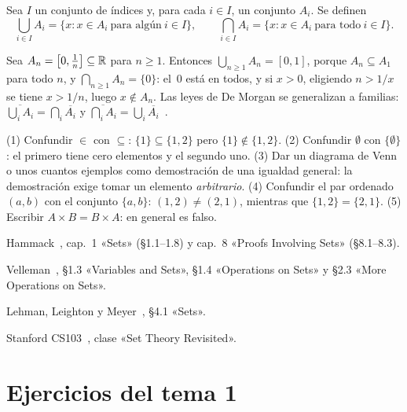 \begin{definicion}
Sea $I$ un conjunto de índices y, para cada $i\in I$, un conjunto $A_i$. Se definen
\[
\bigcup_{i\in I}A_i=\{x : x\in A_i\ \text{para algún}\ i\in I\},\qquad
\bigcap_{i\in I}A_i=\{x : x\in A_i\ \text{para todo}\ i\in I\}.
\]
\end{definicion}

\begin{ejemplo}
Sea $A_n=\bigl[0,\tfrac1n\bigr]\subseteq\mathbb{R}$ para $n\ge 1$. Entonces $\bigcup_{n\ge1}A_n=[0,1]$, porque $A_n\subseteq A_1$ para todo $n$, y $\bigcap_{n\ge 1}A_n=\{0\}$: el~0 está en todos, y si $x>0$, eligiendo $n>1/x$ se tiene $x>1/n$, luego $x\notin A_n$. Las leyes de De Morgan se generalizan a familias: $\overline{\bigcup_i A_i}=\bigcap_i\overline{A_i}$ y $\overline{\bigcap_i A_i}=\bigcup_i\overline{A_i}$~\cite[§1.8]{hammack}.
\end{ejemplo}

\begin{observacion}
(1) Confundir $\in$ con $\subseteq$: $\{1\}\subseteq\{1,2\}$ pero $\{1\}\notin\{1,2\}$. (2) Confundir $\emptyset$ con $\{\emptyset\}$: el primero tiene cero elementos y el segundo uno. (3) Dar un diagrama de Venn o unos cuantos ejemplos como demostración de una igualdad general: la demostración exige tomar un elemento \emph{arbitrario}. (4) Confundir el par ordenado $(a,b)$ con el conjunto $\{a,b\}$: $(1,2)\neq(2,1)$, mientras que $\{1,2\}=\{2,1\}$. (5) Escribir $A\times B=B\times A$: en general es falso.
\end{observacion}

\begin{lecturas}
\item Hammack~\cite{hammack}, cap.~1 «Sets» (§1.1–1.8) y cap.~8 «Proofs Involving Sets» (§8.1–8.3).
\item Velleman~\cite{velleman}, §1.3 «Variables and Sets», §1.4 «Operations on Sets» y §2.3 «More Operations on Sets».
\item Lehman, Leighton y Meyer~\cite{mcs}, §4.1 «Sets».
\item Stanford CS103~\cite{cs103set}, clase «Set Theory Revisited».
\end{lecturas}

\section*{Ejercicios del tema 1}

